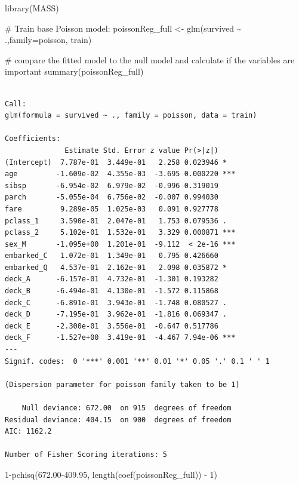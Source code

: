 \documentclass[
  letterpaper,
  DIV=11,
  numbers=noendperiod]{scrartcl}
\newenvironment{Shaded}{\begin{snugshade}}{\end{snugshade}}
\newcommand{\AttributeTok}[1]{\textcolor[rgb]{0.40,0.45,0.13}{#1}}
\newcommand{\CommentTok}[1]{\textcolor[rgb]{0.37,0.37,0.37}{#1}}
\newcommand{\DecValTok}[1]{\textcolor[rgb]{0.68,0.00,0.00}{#1}}
\newcommand{\FloatTok}[1]{\textcolor[rgb]{0.68,0.00,0.00}{#1}}
\newcommand{\FunctionTok}[1]{\textcolor[rgb]{0.28,0.35,0.67}{#1}}
\newcommand{\NormalTok}[1]{\textcolor[rgb]{0.00,0.23,0.31}{#1}}
\newcommand{\OtherTok}[1]{\textcolor[rgb]{0.00,0.23,0.31}{#1}}
\newcommand{\SpecialCharTok}[1]{\textcolor[rgb]{0.37,0.37,0.37}{#1}}
\begin{document}
\begin{Shaded}
\begin{Highlighting}[]
\FunctionTok{library}\NormalTok{(MASS)}

\CommentTok{\# Train base Poisson model:}
\NormalTok{poissonReg\_full }\OtherTok{\textless{}{-}} \FunctionTok{glm}\NormalTok{(survived }\SpecialCharTok{\textasciitilde{}}\NormalTok{ .,}\AttributeTok{family=}\NormalTok{poisson, train)}

\CommentTok{\# compare the fitted model to the null model and calculate if the variables are important}
\FunctionTok{summary}\NormalTok{(poissonReg\_full)}
\end{Highlighting}
\end{Shaded}

\begin{verbatim}

Call:
glm(formula = survived ~ ., family = poisson, data = train)

Coefficients:
              Estimate Std. Error z value Pr(>|z|)    
(Intercept)  7.787e-01  3.449e-01   2.258 0.023946 *  
age         -1.609e-02  4.355e-03  -3.695 0.000220 ***
sibsp       -6.954e-02  6.979e-02  -0.996 0.319019    
parch       -5.055e-04  6.756e-02  -0.007 0.994030    
fare         9.289e-05  1.025e-03   0.091 0.927778    
pclass_1     3.590e-01  2.047e-01   1.753 0.079536 .  
pclass_2     5.102e-01  1.532e-01   3.329 0.000871 ***
sex_M       -1.095e+00  1.201e-01  -9.112  < 2e-16 ***
embarked_C   1.072e-01  1.349e-01   0.795 0.426660    
embarked_Q   4.537e-01  2.162e-01   2.098 0.035872 *  
deck_A      -6.157e-01  4.732e-01  -1.301 0.193282    
deck_B      -6.494e-01  4.130e-01  -1.572 0.115868    
deck_C      -6.891e-01  3.943e-01  -1.748 0.080527 .  
deck_D      -7.195e-01  3.962e-01  -1.816 0.069347 .  
deck_E      -2.300e-01  3.556e-01  -0.647 0.517786    
deck_F      -1.527e+00  3.419e-01  -4.467 7.94e-06 ***
---
Signif. codes:  0 '***' 0.001 '**' 0.01 '*' 0.05 '.' 0.1 ' ' 1

(Dispersion parameter for poisson family taken to be 1)

    Null deviance: 672.00  on 915  degrees of freedom
Residual deviance: 404.15  on 900  degrees of freedom
AIC: 1162.2

Number of Fisher Scoring iterations: 5
\end{verbatim}

\begin{Shaded}
\begin{Highlighting}[]
\DecValTok{1}\SpecialCharTok{{-}}\FunctionTok{pchisq}\NormalTok{(}\FloatTok{672.00{-}409.95}\NormalTok{, }\FunctionTok{length}\NormalTok{(}\FunctionTok{coef}\NormalTok{(poissonReg\_full)) }\SpecialCharTok{{-}} \DecValTok{1}\NormalTok{)}
\end{Highlighting}
\end{Shaded}
\end{document}
